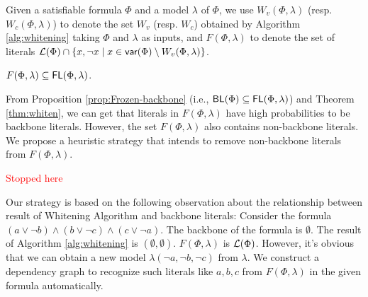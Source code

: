 Given a satisfiable formula $\Phi$ and a model $\lambda$ of $\Phi$, we use $W_v(\Phi,\lambda)$ (resp. $W_c(\Phi,\lambda)$) to denote the set
$W_v$ (resp. $W_c$) obtained by Algorithm \ref{alg:whitening} taking $\Phi$ and $\lambda$ as inputs, and
$F(\Phi,\lambda)$ to denote the set of literals ${\cal L}(\Phi)\cap \{x,\neg x\mid x\in \textsf{var}(\Phi)\setminus W_v(\Phi,\lambda)\}$.



\begin{theorem}\cite{LMZ09}
\label{thm:whiten}
$F(\Phi,\lambda)\subseteq\textsf{FL}(\Phi,\lambda)$.
\end{theorem}

From Proposition \ref{prop:Frozen-backbone} (i.e., $\textsf{BL}(\Phi)\subseteq\textsf{FL}(\Phi,\lambda)$) and Theorem \ref{thm:whiten},
we can get that literals in $F(\Phi,\lambda)$ have high probabilities to be backbone literals. However, the set $F(\Phi,\lambda)$ also contains non-backbone literals. We propose a heuristic strategy that intends to remove non-backbone literals from $F(\Phi,\lambda)$.

\textcolor{red}{Stopped here}

 Our strategy is based on the following observation about the relationship between result of Whitening Algorithm and backbone literals:
 Consider the formula $(a\vee\neg b)\wedge(b\vee\neg c)\wedge(c\vee\neg a)$. The backbone of the formula is $\emptyset$. The result of Algorithm \ref{alg:whitening} is $(\emptyset, \emptyset)$. $F(\Phi,\lambda)$ is ${\cal L}(\Phi)$. However, it's obvious that we can obtain a new model $\lambda(\neg a, \neg b, \neg c)$ from $\lambda$. We construct a dependency graph to recognize such literals like $a,b,c$ from $F(\Phi, \lambda)$ in the given formula automatically.

